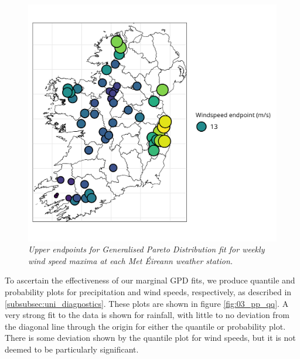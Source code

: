 \documentclass{article}
\numberwithin{equation}{section}
\begin{document}
\begin{figure}[H]
    \centering
    \includegraphics[width = 0.9\linewidth]{plots/034_ws_endpoint.png}
    \caption{\emph{Upper endpoints for Generalised Pareto Distribution fit for weekly wind speed maxima at each Met Éireann weather station.}}
    \label{fig:03_ws_endpoint}
\end{figure}


To ascertain the effectiveness of our marginal GPD fits, we produce quantile and probability plots for precipitation and wind speeds, respectively, as described in \ref{subsubsec:uni_diagnostics}.
These plots are shown in figure \ref{fig:03_pp_qq}.
A very strong fit to the data is shown for rainfall, with little to no deviation from the diagonal line through the origin for either the quantile or probability plot.
There is some deviation shown by the quantile plot for wind speeds, but it is not deemed to be particularly significant.
\end{document}
